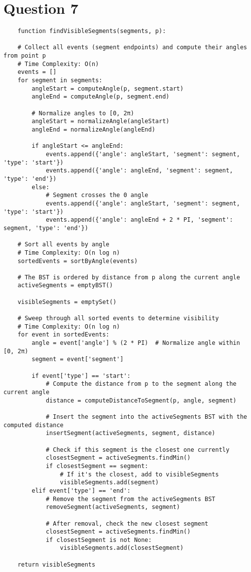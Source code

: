 \documentclass{article}
\begin{document}
\newpage

\section*{Question 7}

\begin{verbatim}
    function findVisibleSegments(segments, p):

    # Collect all events (segment endpoints) and compute their angles from point p
    # Time Complexity: O(n)
    events = []
    for segment in segments:
        angleStart = computeAngle(p, segment.start)
        angleEnd = computeAngle(p, segment.end)

        # Normalize angles to [0, 2π)
        angleStart = normalizeAngle(angleStart)
        angleEnd = normalizeAngle(angleEnd)

        if angleStart <= angleEnd:
            events.append({'angle': angleStart, 'segment': segment, 'type': 'start'})
            events.append({'angle': angleEnd, 'segment': segment, 'type': 'end'})
        else:
            # Segment crosses the 0 angle
            events.append({'angle': angleStart, 'segment': segment, 'type': 'start'})
            events.append({'angle': angleEnd + 2 * PI, 'segment': segment, 'type': 'end'})

    # Sort all events by angle
    # Time Complexity: O(n log n)
    sortedEvents = sortByAngle(events)

    # The BST is ordered by distance from p along the current angle
    activeSegments = emptyBST()

    visibleSegments = emptySet()

    # Sweep through all sorted events to determine visibility
    # Time Complexity: O(n log n)
    for event in sortedEvents:
        angle = event['angle'] % (2 * PI)  # Normalize angle within [0, 2π)
        segment = event['segment']

        if event['type'] == 'start':
            # Compute the distance from p to the segment along the current angle
            distance = computeDistanceToSegment(p, angle, segment)
            
            # Insert the segment into the activeSegments BST with the computed distance
            insertSegment(activeSegments, segment, distance)
            
            # Check if this segment is the closest one currently
            closestSegment = activeSegments.findMin()
            if closestSegment == segment:
                # If it's the closest, add to visibleSegments
                visibleSegments.add(segment)
        elif event['type'] == 'end':
            # Remove the segment from the activeSegments BST
            removeSegment(activeSegments, segment)
            
            # After removal, check the new closest segment
            closestSegment = activeSegments.findMin()
            if closestSegment is not None:
                visibleSegments.add(closestSegment)

    return visibleSegments
\end{verbatim}
\end{document}
